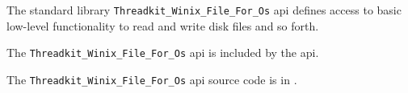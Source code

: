 
The standard library {\tt Threadkit\_Winix\_File\_For\_Os} api defines access to basic low-level 
functionality to read and write disk files and so forth.

The {\tt Threadkit\_Winix\_File\_For\_Os} api is included by the  api.

The {\tt Threadkit\_Winix\_File\_For\_Os} api source code is in .
